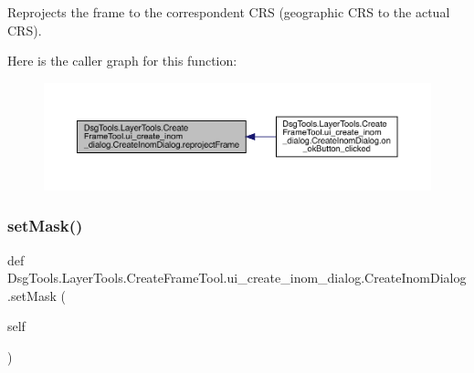 \begin{DoxyVerb}Reprojects the frame to the correspondent CRS (geographic CRS to the actual CRS).
\end{DoxyVerb}
 Here is the caller graph for this function\+:
\nopagebreak
\begin{figure}[H]
\begin{center}
\leavevmode
\includegraphics[width=350pt]{class_dsg_tools_1_1_layer_tools_1_1_create_frame_tool_1_1ui__create__inom__dialog_1_1_create_inom_dialog_a8a78593896895f2ca6129b149e0da5d3_icgraph}
\end{center}
\end{figure}
\mbox{\label{class_dsg_tools_1_1_layer_tools_1_1_create_frame_tool_1_1ui__create__inom__dialog_1_1_create_inom_dialog_a889bb78da6eeebd98d6b9e5d881f9528}} 
\subsubsection{\texorpdfstring{set\+Mask()}{setMask()}}
{\footnotesize\ttfamily def Dsg\+Tools.\+Layer\+Tools.\+Create\+Frame\+Tool.\+ui\+\_\+create\+\_\+inom\+\_\+dialog.\+Create\+Inom\+Dialog.\+set\+Mask (\begin{DoxyParamCaption}\item[{}]{self }\end{DoxyParamCaption})}

